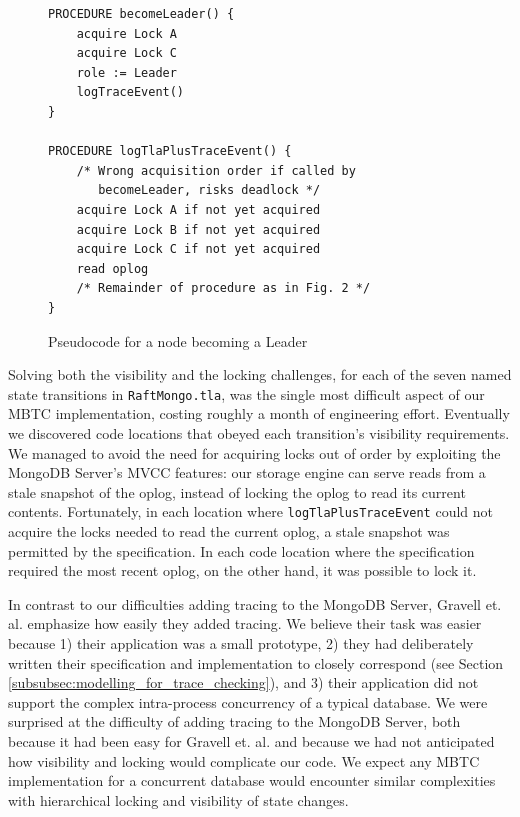 \documentclass{vldb}
\begin{document}
\begin{figure}
\begin{verbatim}
PROCEDURE becomeLeader() {
    acquire Lock A
    acquire Lock C
    role := Leader
    logTraceEvent()
}

PROCEDURE logTlaPlusTraceEvent() {
    /* Wrong acquisition order if called by
       becomeLeader, risks deadlock */
    acquire Lock A if not yet acquired
    acquire Lock B if not yet acquired
    acquire Lock C if not yet acquired
    read oplog
    /* Remainder of procedure as in Fig. 2 */
}
\end{verbatim}
\caption{Pseudocode for a node becoming a Leader}
\label{fig:logTlaPlusTraceEvent}
\end{figure}

Solving both the visibility and the locking challenges, for each of the seven named state transitions in \texttt{RaftMongo.tla}, was the single most difficult aspect of our MBTC implementation, costing roughly a month of engineering effort. 
Eventually we discovered code locations that obeyed each transition's visibility requirements.
We managed to avoid the need for acquiring locks out of order by exploiting the MongoDB Server's MVCC features: our storage engine can serve reads from a stale snapshot of the oplog, instead of locking the oplog to read its current contents.
Fortunately, in each location where \texttt{logTlaPlusTraceEvent} could not acquire the locks needed to read the current oplog, a stale snapshot was permitted by the specification.
In each code location where the specification required the most recent oplog, on the other hand, it was possible to lock it.


In contrast to our difficulties adding tracing to the MongoDB Server, Gravell et. al. \cite{Gravell11ConcurrentDevelopmentOfModelAndImplementation} emphasize how easily they added tracing.
We believe their task was easier because 1) their application was a small prototype, 2) they had deliberately written their specification and implementation to closely correspond (see Section \ref{subsubsec:modelling_for_trace_checking}), and 3) their application did not support the complex intra-process concurrency of a typical database.
We were surprised at the difficulty of adding tracing to the MongoDB Server, both because it had been easy for Gravell et. al. and because we had not anticipated how visibility and locking would complicate our code.
We expect any MBTC implementation for a concurrent database would encounter similar complexities with hierarchical locking and visibility of state changes.
\end{document}
